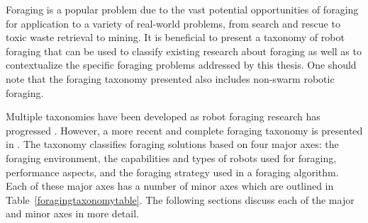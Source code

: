 Foraging is a popular problem due to the vast potential opportunities of foraging for application to a variety of real-world problems, from search and rescue \cite{jennings1997cooperative} to toxic waste retrieval to mining. It is beneficial to present a taxonomy of robot foraging that can be used to classify existing research about foraging as well as to contextualize the specific foraging problems addressed by this thesis. One should note that the foraging taxonomy presented also includes non-swarm robotic foraging.

Multiple taxonomies have been developed as robot foraging research has progressed \cite{oster1978caste,ostergaard2001emergent}. However, a more recent and complete foraging taxonomy is presented in \cite{winfield2009foraging}. The taxonomy classifies foraging solutions based on four major axes: the foraging environment, the capabilities and types of robots used for foraging, performance aspects, and the foraging strategy used in a foraging algorithm. Each of these major axes has a number of minor axes which are outlined in Table~\ref{foragingtaxonomytable}.  The following sections discuss each of the major and minor axes in more detail.

